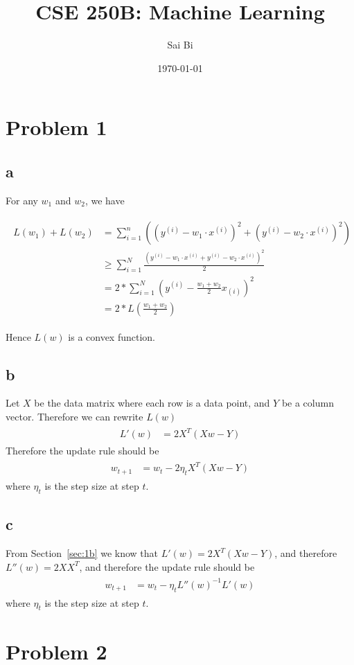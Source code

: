 \documentclass[a4paper,11pt]{article}
\theoremstyle{mytheor}
\newcommand{\myequ}[1]{\begin{align}\begin{split} #1 \end{split}\end{align}}
\begin{document}
\title{CSE 250B: Machine Learning}

\author{Sai Bi}

\date{\today}

\maketitle

\section*{Problem 1}
\subsection*{a}
For any $w_1$ and $w_2$, we have

\begin{align}
	\begin{split}
		L(w_1) + L(w_2) &= \sum_{i=1}^{n} ((y^{(i)} - w_1 \cdot x^{(i)})^2 + (y^{(i)} - w_2 \cdot x^{(i)})^2) \\
						& \geq  \sum_{i=1}^{N}\frac{(y^{(i)} -  w_1 \cdot x^{(i)} + y^{(i)} -  w_2 \cdot x^{(i)} )^2 }{2} \\
					& = 2 * \sum_{i=1}^{N} (y^{(i)} - \frac{w_1 + w_2}{2} x_{(i)})^2 \\
					& = 2 * L(\frac{w_1+w_2}{2})
	\end{split}
\end{align}

Hence $L(w)$ is a convex function.

\subsection*{b}\label{sec:1b}
Let $X$  be the data matrix where each row is a data point, and $Y$ be a column vector. Therefore we can rewrite $L(w)$
\myequ{
	L'(w) &= 2X^T(Xw-Y) 
}
Therefore the update rule should be 
\myequ{
	w_{t+1} &= w_t - 2\eta_{t} X^T (Xw-Y) 
}
where $\eta_{t}$ is the step size at step $t$.
\subsection*{c}
From Section~\ref{sec:1b} we know that $L'(w) = 2X^T(Xw-Y) $, and therefore $L''(w) = 2XX^T$, and therefore the update
rule should be
\myequ{
	w_{t+1} &= w_t - \eta_{t} L''(w)^{-1} L'(w)
}
where $\eta_{t}$ is the step size at step $t$.


\section*{Problem 2}
\end{document}
